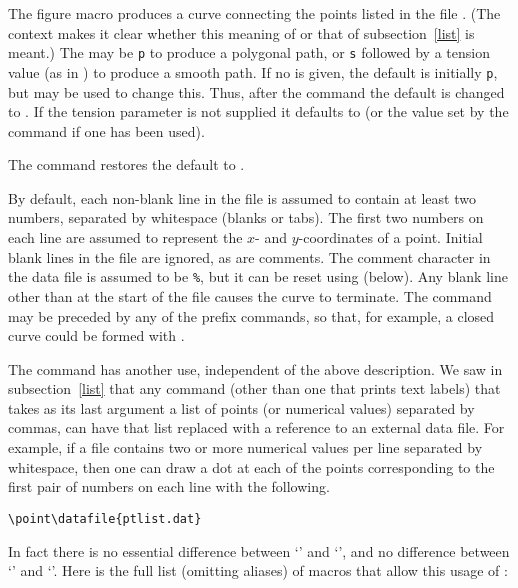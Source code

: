 \documentclass[letterpaper]{article}
\begin{document}
The figure macro  produces a curve connecting the points
listed in the file . (The context makes it clear whether this
meaning of  or that of subsection~\ref{list} is meant.) The
 may be \texttt{p} to produce a polygonal path, or \texttt{s}
followed by a tension value (as in ) to produce a smooth path.
If no  is given, the default is initially \texttt{p}, but
 may be used to change this. Thus, after the command
 the default  is
changed to . If the tension parameter is not
supplied it defaults to  (or the value set by the
 command if one has been used).

The command  restores the default  to
.

By default, each non-blank line in the file is assumed to contain at
least two numbers, separated by whitespace (blanks or tabs). The first
two numbers on each line are assumed to represent the $x$- and
$y$-coordinates of a point. Initial blank lines in the file are ignored,
as are comments. The comment character in the data file is assumed to be
\texttt{\%}, but it can be reset using  (below). Any
blank line other than at the start of the file causes the curve to
terminate. The  command may be preceded by any of the
prefix commands, so that, for example, a closed curve could be formed
with .

The  command has another use,
independent of the above description. We saw in subsection~\ref{list}
that any \mfp{} command (other than one that prints text labels) that
takes as its last argument a list of points (or numerical values)
separated by commas, can have that list replaced with a reference to an
external data file. For example, if a file  contains
two or more numerical values per line separated by whitespace, then one
can draw a dot at each of the points corresponding to the first pair of
numbers on each line with the following.
\begin{verbatim}
\point\datafile{ptlist.dat}
\end{verbatim}
In fact there is no essential difference between `'
and `', and no difference between
`' and `'.
Here is the full list (omitting aliases) of \mfp{} macros that allow
this usage of :
\end{document}
